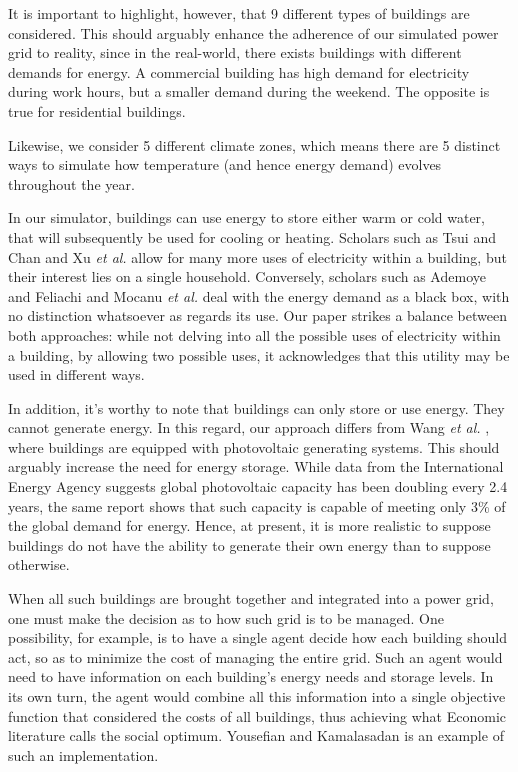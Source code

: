 \documentclass{article}
\begin{document}
It is important to highlight, however, that 9 different types of buildings are considered. This should arguably enhance the adherence of our simulated power grid to reality, since in the real-world, there exists buildings with different demands for energy. A commercial building has high demand for electricity during work hours, but a smaller demand during the weekend. The opposite is true for residential buildings.  

Likewise, we consider 5 different climate zones, which means there are 5 distinct ways to simulate how temperature (and hence energy demand) evolves throughout the year. 

In our simulator, buildings can use energy to store either warm or cold water, that will subsequently be used for cooling or heating. Scholars such as Tsui and Chan \cite{Tsui2012} and Xu \emph{et al.} \cite{Xu2020} allow for many more uses of electricity within a building, but their interest lies on a single household. Conversely, scholars such as Ademoye and Feliachi \cite{Ademoye2012} and Mocanu \emph{et al.} \cite{Mocanu2019} deal with the energy demand as a black box, with no distinction whatsoever as regards its use. Our paper strikes a balance between both approaches: while not delving into all the possible uses of electricity within a building, by allowing two possible uses, it acknowledges that this utility may be used in different ways.

In addition, it's worthy to note that buildings can only store or use energy. They cannot generate energy. In this regard, our approach differs from Wang \emph{et al.} \cite{Wang2016}, where buildings are equipped with photovoltaic generating systems. This should arguably increase the need for energy storage. While data from the International Energy Agency \cite{IEA2020} suggests global photovoltaic capacity has been doubling every 2.4 years, the same report shows that such capacity is capable of meeting only 3\% of the global demand for energy. Hence, at present, it is more realistic to suppose buildings do not have the ability to generate their own energy than to suppose otherwise.

When all such buildings are brought together and integrated into a power grid, one must make the decision as to how such grid is to be managed. One possibility, for example, is to have a single agent decide how each building should act, so as to minimize the cost of managing the entire grid. Such an agent would need to have information on each building's energy needs and storage levels. In its own turn, the agent would combine all this information into a single objective function that considered the costs of all buildings, thus achieving what Economic literature calls the social optimum. Yousefian and Kamalasadan \cite{Yousefian2016} is an example of such an implementation. 
\end{document}
